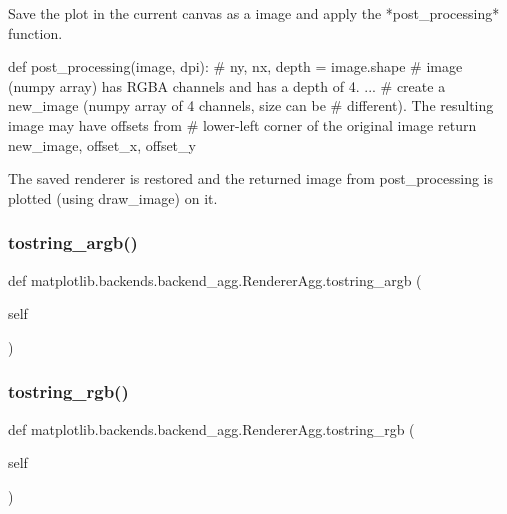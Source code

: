 \begin{DoxyVerb}Save the plot in the current canvas as a image and apply
the *post_processing* function.

   def post_processing(image, dpi):
     # ny, nx, depth = image.shape
     # image (numpy array) has RGBA channels and has a depth of 4.
     ...
     # create a new_image (numpy array of 4 channels, size can be
     # different). The resulting image may have offsets from
     # lower-left corner of the original image
     return new_image, offset_x, offset_y

The saved renderer is restored and the returned image from
post_processing is plotted (using draw_image) on it.
\end{DoxyVerb}
 \mbox{\label{classmatplotlib_1_1backends_1_1backend__agg_1_1RendererAgg_af26c0dc4d559d05c23c37180441bf148}} 
\subsubsection{\texorpdfstring{tostring\+\_\+argb()}{tostring\_argb()}}
{\footnotesize\ttfamily def matplotlib.\+backends.\+backend\+\_\+agg.\+Renderer\+Agg.\+tostring\+\_\+argb (\begin{DoxyParamCaption}\item[{}]{self }\end{DoxyParamCaption})}

\mbox{\label{classmatplotlib_1_1backends_1_1backend__agg_1_1RendererAgg_a2964c4dee17616376b0be0a67d5b4592}} 
\subsubsection{\texorpdfstring{tostring\+\_\+rgb()}{tostring\_rgb()}}
{\footnotesize\ttfamily def matplotlib.\+backends.\+backend\+\_\+agg.\+Renderer\+Agg.\+tostring\+\_\+rgb (\begin{DoxyParamCaption}\item[{}]{self }\end{DoxyParamCaption})}

